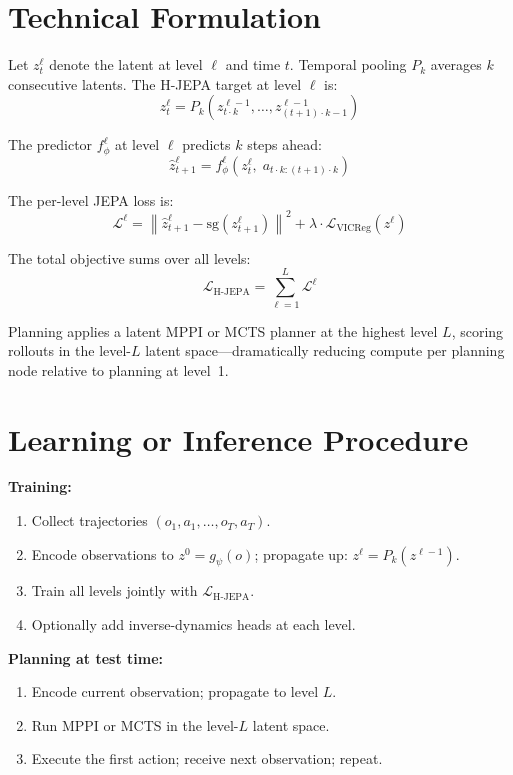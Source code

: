 \documentclass[10pt,twocolumn]{article}
\begin{document}
\section{Technical Formulation}

Let $z_t^\ell$ denote the latent at level $\ell$ and time $t$. Temporal
pooling $P_k$ averages $k$ consecutive latents. The H-JEPA target at level
$\ell$ is:
\[
z_t^{\ell} = P_k\!\left(z_{t \cdot k}^{\ell-1}, \ldots,
  z_{(t+1) \cdot k - 1}^{\ell-1}\right)
\]

The predictor $f^\ell_\phi$ at level $\ell$ predicts $k$ steps ahead:
\[
\hat{z}_{t+1}^\ell = f^\ell_\phi\!\left(z_t^\ell,\;
  a_{t \cdot k : (t+1) \cdot k}\right)
\]

The per-level JEPA loss is:
\[
\mathcal{L}^\ell = \left\| \hat{z}_{t+1}^\ell
  - \mathrm{sg}(z_{t+1}^\ell) \right\|^2
  + \lambda \cdot \mathcal{L}_\text{VICReg}(z^\ell)
\]

The total objective sums over all levels:
\[
\mathcal{L}_\text{H-JEPA} = \sum_{\ell=1}^{L} \mathcal{L}^\ell
\]

Planning applies a latent MPPI or MCTS planner at the highest level $L$,
scoring rollouts in the level-$L$ latent space---dramatically reducing
compute per planning node relative to planning at level~1.

\section{Learning or Inference Procedure}

\textbf{Training:}
\begin{enumerate}[itemsep=2pt,parsep=0pt]
  \item Collect trajectories $(o_1, a_1, \ldots, o_T, a_T)$.
  \item Encode observations to $z^0 = g_\psi(o)$; propagate up:
    $z^\ell = P_k(z^{\ell-1})$.
  \item Train all levels jointly with $\mathcal{L}_\text{H-JEPA}$.
  \item Optionally add inverse-dynamics heads at each level.
\end{enumerate}

\textbf{Planning at test time:}
\begin{enumerate}[itemsep=2pt,parsep=0pt]
  \item Encode current observation; propagate to level $L$.
  \item Run MPPI or MCTS in the level-$L$ latent space.
  \item Execute the first action; receive next observation; repeat.
\end{enumerate}
\end{document}
